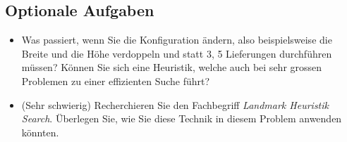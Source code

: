 \documentclass[a4paper,11pt,german,notitlepage]{report}
\begin{document}
\subsection*{Optionale Aufgaben}
\begin{itemize}
    \item Was passiert, wenn Sie die Konfiguration ändern, also beispielsweise die Breite und die Höhe verdoppeln und statt 3, 5 Lieferungen durchführen müssen? Können Sie sich eine Heuristik, welche auch bei sehr grossen Problemen zu einer effizienten Suche führt?
    \item (Sehr schwierig) Recherchieren Sie den Fachbegriff \textit{Landmark Heuristik Search}. Überlegen Sie, wie Sie diese Technik in diesem Problem anwenden könnten.
\end{itemize}
\end{document}
